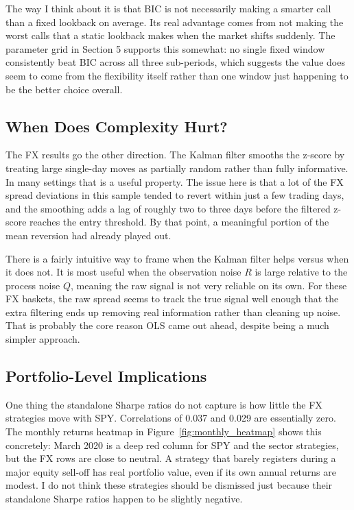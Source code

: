\documentclass[12pt]{article}
\begin{document}
The way I think about it is that BIC is not necessarily making a smarter call than a fixed lookback on average. Its real advantage comes from not making the worst calls that a static lookback makes when the market shifts suddenly. The parameter grid in Section 5 supports this somewhat: no single fixed window consistently beat BIC across all three sub-periods, which suggests the value does seem to come from the flexibility itself rather than one window just happening to be the better choice overall.

\subsection{When Does Complexity Hurt?}

The FX results go the other direction. The Kalman filter smooths the z-score by treating large single-day moves as partially random rather than fully informative. In many settings that is a useful property. The issue here is that a lot of the FX spread deviations in this sample tended to revert within just a few trading days, and the smoothing adds a lag of roughly two to three days before the filtered z-score reaches the entry threshold. By that point, a meaningful portion of the mean reversion had already played out.

There is a fairly intuitive way to frame when the Kalman filter helps versus when it does not. It is most useful when the observation noise $R$ is large relative to the process noise $Q$, meaning the raw signal is not very reliable on its own. For these FX baskets, the raw spread seems to track the true signal well enough that the extra filtering ends up removing real information rather than cleaning up noise. That is probably the core reason OLS came out ahead, despite being a much simpler approach.

\subsection{Portfolio-Level Implications}

One thing the standalone Sharpe ratios do not capture is how little the FX strategies move with SPY. Correlations of 0.037 and 0.029 are essentially zero. The monthly returns heatmap in Figure~\ref{fig:monthly_heatmap} shows this concretely: March 2020 is a deep red column for SPY and the sector strategies, but the FX rows are close to neutral. A strategy that barely registers during a major equity sell-off has real portfolio value, even if its own annual returns are modest. I do not think these strategies should be dismissed just because their standalone Sharpe ratios happen to be slightly negative.
\end{document}
